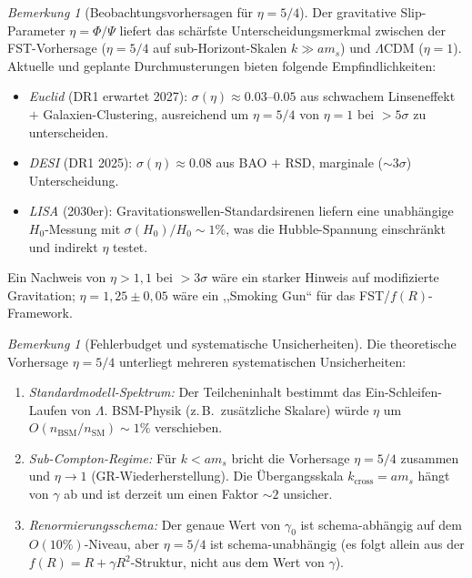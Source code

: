 \documentclass[12pt,a4paper]{article}
\theoremstyle{definition}
\theoremstyle{plain}
\theoremstyle{remark}
\newtheorem{remark}[definition]{Bemerkung}
\begin{document}
\begin{remark}[Beobachtungsvorhersagen f\"ur $\eta = 5/4$]
\label{rem:forecasts}
Der gravitative Slip-Parameter $\eta = \Phi/\Psi$ liefert das sch\"arfste Unterscheidungsmerkmal zwischen der FST-Vorhersage ($\eta = 5/4$ auf sub-Horizont-Skalen $k \gg a m_s$) und $\Lambda$CDM ($\eta = 1$). Aktuelle und geplante Durchmusterungen bieten folgende Empfindlichkeiten:
\begin{itemize}
\item \emph{Euclid} (DR1 erwartet 2027): $\sigma(\eta) \approx 0.03$--$0.05$ aus schwachem Linseneffekt $+$ Galaxien-Clustering, ausreichend um $\eta = 5/4$ von $\eta = 1$ bei $> 5\sigma$ zu unterscheiden.
\item \emph{DESI} (DR1 2025): $\sigma(\eta) \approx 0.08$ aus BAO $+$ RSD, marginale ($\sim 3\sigma$) Unterscheidung.
\item \emph{LISA} (2030er): Gravitationswellen-Standardsirenen liefern eine unabh\"angige $H_0$-Messung mit $\sigma(H_0)/H_0 \sim 1\%$, was die Hubble-Spannung einschr\"ankt und indirekt $\eta$ testet.
\end{itemize}
Ein Nachweis von $\eta > 1{,}1$ bei $> 3\sigma$ w\"are ein starker Hinweis auf modifizierte Gravitation; $\eta = 1{,}25 \pm 0{,}05$ w\"are ein ,,Smoking Gun`` f\"ur das FST/$f(R)$-Framework.
\end{remark}

\begin{remark}[Fehlerbudget und systematische Unsicherheiten]
\label{rem:error-budget}
Die theoretische Vorhersage $\eta = 5/4$ unterliegt mehreren systematischen Unsicherheiten:
\begin{enumerate}
\item \emph{Standardmodell-Spektrum:} Der Teilcheninhalt bestimmt das Ein-Schleifen-Laufen von $\Lambda$. BSM-Physik (z.\,B.\ zus\"atzliche Skalare) w\"urde $\eta$ um $O(n_{\mathrm{BSM}}/n_{\mathrm{SM}}) \sim 1\%$ verschieben.
\item \emph{Sub-Compton-Regime:} F\"ur $k < a m_s$ bricht die Vorhersage $\eta = 5/4$ zusammen und $\eta \to 1$ (GR-Wiederherstellung). Die \"Ubergangsskala $k_{\mathrm{cross}} = a m_s$ h\"angt von $\gamma$ ab und ist derzeit um einen Faktor $\sim 2$ unsicher.
\item \emph{Renormierungsschema:} Der genaue Wert von $\gamma_0$ ist schema-abh\"angig auf dem $O(10\%)$-Niveau, aber $\eta = 5/4$ ist schema-unabh\"angig (es folgt allein aus der $f(R) = R + \gamma R^2$-Struktur, nicht aus dem Wert von $\gamma$).
\end{enumerate}
\end{remark}
\end{document}

